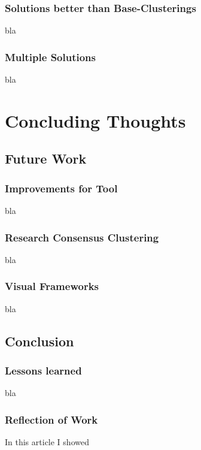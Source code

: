 \documentclass[
	a4paper,
	english,
	twoside,
	openright,               
	11pt                            
	]{report}
\begin{document}
\section{Solutions better than Base-Clusterings}
bla

\section{Multiple Solutions}
bla

\part{Concluding Thoughts}

\chapter{Future Work}\label{cha:futurework}

\section{Improvements for Tool}

bla

\section{Research Consensus Clustering}

bla

\section{Visual Frameworks}

bla


\chapter{Conclusion}\label{cha:conclusion}

\section{Lessons learned}
bla 

\section{Reflection of Work}
In this article I showed 
\end{document}
